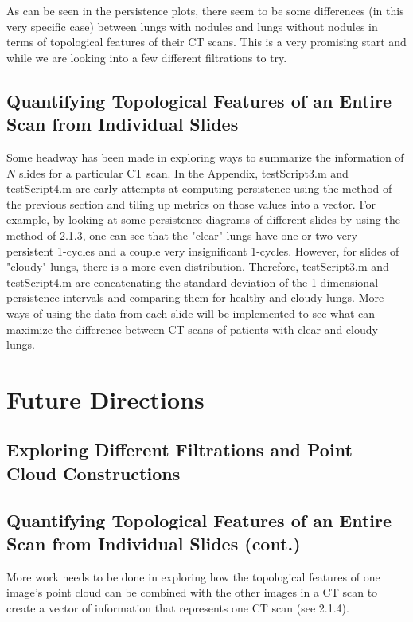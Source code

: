 \documentclass[12pt]{report}
\begin{document}
As can be seen in the persistence plots, there seem to be some differences (in this very specific case) between lungs with nodules and lungs without nodules in terms of topological features of their CT scans. This is a very promising start and while we are looking into a few different filtrations to try.\newline

\subsection{Quantifying Topological Features of an Entire Scan from Individual Slides}

Some headway has been made in exploring ways to summarize the information of $N$ slides for a particular CT scan. In the Appendix, testScript3.m and testScript4.m are early attempts at computing persistence using the method of the previous section and tiling up metrics on those values into a vector. For example, by looking at some persistence diagrams of different slides by using the method of 2.1.3, one can see that the "clear" lungs have one or two very persistent 1-cycles and a couple very insignificant 1-cycles. However, for slides of "cloudy" lungs, there is a more even distribution. Therefore, testScript3.m and testScript4.m are concatenating the standard deviation of the 1-dimensional persistence intervals and comparing them for healthy and cloudy lungs. More ways of using the data from each slide will be implemented to see what can maximize the difference between CT scans of patients with clear and cloudy lungs.

\section{Future Directions}

\subsection{Exploring Different Filtrations and Point Cloud Constructions}

\subsection{Quantifying Topological Features of an Entire Scan from Individual Slides (cont.)}

More work needs to be done in exploring how the topological features of one image's point cloud can be combined with the other images in a CT scan to create a vector of information that represents one CT scan (see 2.1.4).
\end{document}
